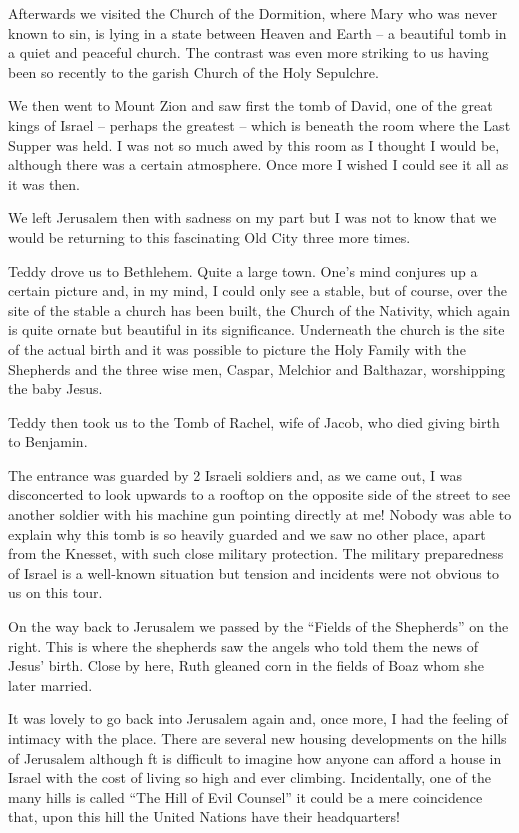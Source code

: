 Afterwards we visited the Church of the Dormition, where Mary who was
never known to sin, is lying in a state between Heaven and Earth -- a
beautiful tomb in a quiet and peaceful church. The contrast was even
more striking to us having been so recently to the garish Church of
the Holy Sepulchre.

We then went to Mount Zion and saw first the tomb of David, one of the
great kings of Israel -- perhaps the greatest -- which is beneath the
room where the Last Supper was held. I was not so much awed by this
room as I thought I would be, although there was a certain
atmosphere. Once more I wished I could see it all as it was then.

We left Jerusalem then with sadness on my part but I was not to know
that we would be returning to this fascinating Old City three more
times.

Teddy drove us to Bethlehem. Quite a large town. One's mind conjures
up a certain picture and, in my mind, I could only see a stable, but
of course, over the site of the stable a church has been built, the
Church of the Nativity, which again is quite ornate but beautiful in
its significance. Underneath the church is the site of the actual
birth and it was possible to picture the Holy Family with the
Shepherds and the three wise men, Caspar, Melchior and Balthazar,
worshipping the baby Jesus.

Teddy then took us to the Tomb of Rachel, wife of Jacob, who died
giving birth to Benjamin.

The entrance was guarded by 2 Israeli soldiers and, as we came out, I
was disconcerted to look upwards to a rooftop on the opposite side of
the street to see another soldier with his machine gun pointing
directly at me! Nobody was able to explain why this tomb is so heavily
guarded and we saw no other place, apart from the Knesset, with such
close military protection. The military preparedness of Israel is a
well-known situation but tension and incidents were not obvious to us
on this tour.

On the way back to Jerusalem we passed by the ``Fields of the
Shepherds'' on the right. This is where the shepherds saw the angels
who told them the news of Jesus' birth. Close by here, Ruth gleaned
corn in the fields of Boaz whom she later married.

It was lovely to go back into Jerusalem again and, once more, I had
the feeling of intimacy with the place. There are several new housing
developments on the hills of Jerusalem although ft is difficult to
imagine how anyone can afford a house in Israel with the cost of
living so high and ever climbing. Incidentally, one of the many hills
is called ``The Hill of Evil Counsel'' it could be a mere coincidence
that, upon this hill the United Nations have their headquarters!

